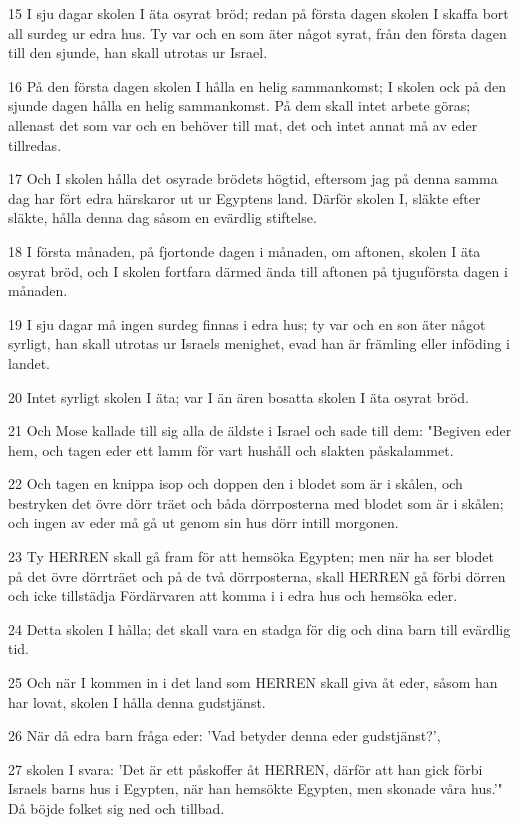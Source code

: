 \par 15 I sju dagar skolen I äta osyrat bröd; redan på första dagen skolen I skaffa bort all surdeg ur edra hus. Ty var och en som äter något syrat, från den första dagen till den sjunde, han skall utrotas ur Israel.
\par 16 På den första dagen skolen I hålla en helig sammankomst; I skolen ock på den sjunde dagen hålla en helig sammankomst. På dem skall intet arbete göras; allenast det som var och en behöver till mat, det och intet annat må av eder tillredas.
\par 17 Och I skolen hålla det osyrade brödets högtid, eftersom jag på denna samma dag har fört edra härskaror ut ur Egyptens land. Därför skolen I, släkte efter släkte, hålla denna dag såsom en evärdlig stiftelse.
\par 18 I första månaden, på fjortonde dagen i månaden, om aftonen, skolen I äta osyrat bröd, och I skolen fortfara därmed ända till aftonen på tjuguförsta dagen i månaden.
\par 19 I sju dagar må ingen surdeg finnas i edra hus; ty var och en son äter något syrligt, han skall utrotas ur Israels menighet, evad han är främling eller inföding i landet.
\par 20 Intet syrligt skolen I äta; var I än ären bosatta skolen I äta osyrat bröd.
\par 21 Och Mose kallade till sig alla de äldste i Israel och sade till dem: "Begiven eder hem, och tagen eder ett lamm för vart hushåll och slakten påskalammet.
\par 22 Och tagen en knippa isop och doppen den i blodet som är i skålen, och bestryken det övre dörr träet och båda dörrposterna med blodet som är i skålen; och ingen av eder må gå ut genom sin hus dörr intill morgonen.
\par 23 Ty HERREN skall gå fram för att hemsöka Egypten; men när ha ser blodet på det övre dörrträet och på de två dörrposterna, skall HERREN gå förbi dörren och icke tillstädja Fördärvaren att komma i i edra hus och hemsöka eder.
\par 24 Detta skolen I hålla; det skall vara en stadga för dig och dina barn till evärdlig tid.
\par 25 Och när I kommen in i det land som HERREN skall giva åt eder, såsom han har lovat, skolen I hålla denna gudstjänst.
\par 26 När då edra barn fråga eder: 'Vad betyder denna eder gudstjänst?',
\par 27 skolen I svara: 'Det är ett påskoffer åt HERREN, därför att han gick förbi Israels barns hus i Egypten, när han hemsökte Egypten, men skonade våra hus.'" Då böjde folket sig ned och tillbad.
